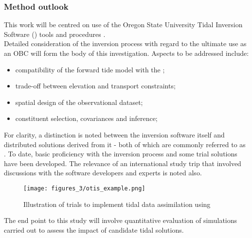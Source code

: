 \subsubsection{Method outlook}
This work will be centred on use of the Oregon State University Tidal Inversion Software (\OTIS{}) tools and procedures \cite{Egbert:2002ug}.\\
Detailed consideration of the \OTIS{} inversion process with regard to the ultimate use as an OBC will form the body of this investigation.   Aspects to be addressed include:
\begin{itemize}
\item compatibility of the \OTIS{} forward tide model with the \OGCM{};
\item trade-off between elevation and transport constraints;
\item spatial design of the observational dataset;
\item constituent selection, covariances and inference;
\end{itemize}

For clarity, a distinction is noted between the inversion software itself and distributed solutions derived from it - both of which are commonly referred to as \OTIS{}.  To date, basic proficiency with the \OTIS{} inversion process and some trial solutions have been developed.  The relevance of an international study trip that involved discussions with the software developers and experts is noted also.

\begin{figure}[h]
\begin{center}
\texttt{[image: figures\_3/otis\_example.png]}
\caption{Illustration of trials to implement tidal data assimilation using \OTIS{}}
\label{fig:OTIS_eg}
\end{center}
\end{figure}


The end point to this study will involve quantitative evaluation of \OGCM{} simulations carried out to assess the impact of candidate tidal solutions.










